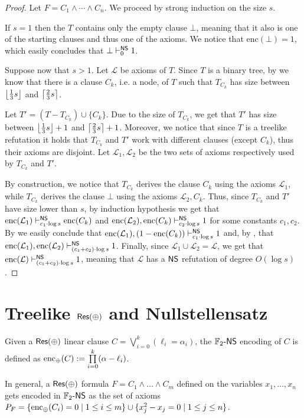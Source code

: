 \begin{proof}
    Let $F = C_1 \land \cdots \land C_n$. We proceed by strong induction on the size $s$.
    
    If $s = 1$ then the $T$ contains only the empty clause $\bot$, meaning that it also is one of the starting clauses and thus one of the axioms. We notice that $\mathrm{enc}(\bot) = 1$, which easily concludes that $\bot \vdash_{0}^{\mathsf{NS}} 1$.

    Suppose now that $s > 1$. Let $\mathcal{L}$ be axioms of $T$. Since $T$ is a binary tree, by  we know that there is a clause $C_k$, i.e. a node, of $T$ such that $T_{C_k}$ has size between $\left \lfloor \frac{1}{3} s \right \rfloor$ and $\left \lceil \frac{2}{3} s \right \rceil$.

    Let $T' = (T - T_{C_k}) \cup \{C_k\}$. Due to the size of $T_{C_k}$, we get that $T'$ has size between $\left \lfloor \frac{1}{3} s \right \rfloor+1$ and $\left \lceil \frac{2}{3} s \right \rceil+1$. Moreover, we notice that since $T$ is a treelike refutation it holds that $T_{C_k}$ and $T'$ work with different clauses (except $C_k$), thus their axioms are disjoint. Let $\mathcal{L}_1, \mathcal{L}_2$ be the two sets of axioms respectively used by $T_{C_k}$ and $T'$.
    
    By construction, we notice that $T_{C_k}$ derives the clause $C_k$ using the axioms $\mathcal{L}_1$, while $T_{C_k}$ derives the clause $\bot$ using the axioms $\mathcal{L}_2, C_k$. Thus, since $T_{C_k}$ and $T'$ have size lower than $s$, by induction hypothesis we get that $\mathrm{enc}(\mathcal{L}_1) \vdash_{c_1 \cdot \log s}^{\mathsf{NS}} \mathrm{enc}(C_k)$ and $\mathrm{enc}(\mathcal{L}_2), \mathrm{enc}(C_k) \vdash_{c_2 \cdot \log s}^{\mathsf{NS}} 1$ for some constants $c_1, c_2$. By  we easily conclude that $\mathrm{enc}(\mathcal{L}_1), (1- \mathrm{enc}(C_k)) \vdash_{c_1 \cdot \log s}^{\mathsf{NS}} 1$ and, by , that $\mathrm{enc}(\mathcal{L}_1), \mathrm{enc}(\mathcal{L}_2) \vdash_{(c_1+c_2) \cdot \log s}^{\mathsf{NS}} 1$. Finally, since $\mathcal{L}_1 \cup \mathcal{L}_2 = \mathcal{L}$, we get that $\mathrm{enc}(\mathcal{L}) \vdash_{(c_1+c_2) \cdot \log s}^{\mathsf{NS}} 1$, meaning that $\mathcal{L}$ has a $\mathsf{NS}$ refutation of degree $O(\log s)$.

\end{proof}

\newpage

\section{Treelike $\mathsf{Res(\oplus)}$ and Nullstellensatz}

\begin{definition}
    Given a $\mathsf{Res(\oplus)}$ linear clause $C = \bigvee\limits_{i = 0}^k (\ell_i = \alpha_i)$, the $\mathbb{F}_2\text{-}\mathsf{NS}$ encoding of $C$ is defined as $\mathrm{enc}_{\oplus}(C) := \prod\limits_{i = 0}^k (\alpha - \ell_i)$.
    
    In general, a $\mathsf{Res(\oplus)}$ formula $F = C_1 \land \ldots \land C_m$ defined on the variables $x_1, \ldots, x_n$ gets encoded in $\mathbb{F}_2\text{-}\mathsf{NS}$ as the set of axioms $P_F = \{\mathrm{enc}_{\oplus}(C_i) = 0 \mid 1 \leq i \leq m\} \cup \{x_j^2-x_j = 0 \mid 1 \leq j \leq n\}$.
\end{definition}

